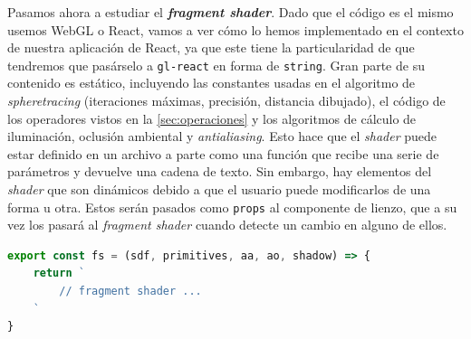 

Pasamos ahora a estudiar el \textbf{\textit{fragment shader}}. Dado que el código es el mismo usemos WebGL o React, vamos a ver cómo lo hemos implementado en el contexto de nuestra aplicación de React, ya que este tiene la particularidad de que tendremos que pasárselo a \texttt{gl-react} en forma de \texttt{string}. Gran parte de su contenido es estático, incluyendo las constantes usadas en el algoritmo de \textit{spheretracing} (iteraciones máximas, precisión, distancia dibujado), el código de los operadores vistos en la \autoref{sec:operaciones} y los algoritmos de cálculo de iluminación, oclusión ambiental y \textit{antialiasing}. Esto hace que el \textit{shader} puede estar definido en un archivo a parte como una función que recibe una serie de parámetros y devuelve una cadena de texto. Sin embargo, hay elementos del \textit{shader} que son dinámicos debido a que el usuario puede modificarlos de una forma u otra. Estos serán pasados como \texttt{props} al componente de lienzo, que a su vez los pasará al \textit{fragment shader} cuando detecte un cambio en alguno de ellos.
\begin{lstlisting}[language=JavaScript, caption=Definición del procesador de fragmentos]
export const fs = (sdf, primitives, aa, ao, shadow) => {
    return `
        // fragment shader ...
    `
}
\end{lstlisting}


